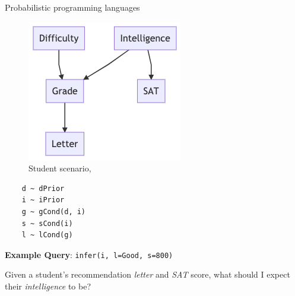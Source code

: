 \begin{frame}[fragile]{Probabilistic programming languages}
\begin{minipage}{0.4\linewidth}
    \begin{figure}
        \centering
        \includegraphics[width=\linewidth]{Figures/lic/student-network.png}
        \caption{Student scenario, \parencite{koller2009probabilistic}}
    \end{figure}
\end{minipage}
\pause
\begin{minipage}{0.58\linewidth}
    \begin{verbatim}
    d ~ dPrior
    i ~ iPrior
    g ~ gCond(d, i)
    s ~ sCond(i)
    l ~ lCond(g)
    \end{verbatim}
\end{minipage}

\pause

\textbf{Example Query}: \texttt{infer(i, {l=Good, s=800})}

Given a student's recommendation \emph{letter} and \emph{SAT} score,
what should I expect their \emph{intelligence} to be?


\end{frame}


